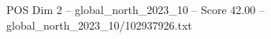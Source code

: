 \begin{textsample}{POS Dim 2 – global\_north\_2023\_10 – Score 42.00 – global\_north\_2023\_10/102937926.txt}
\end{textsample}
